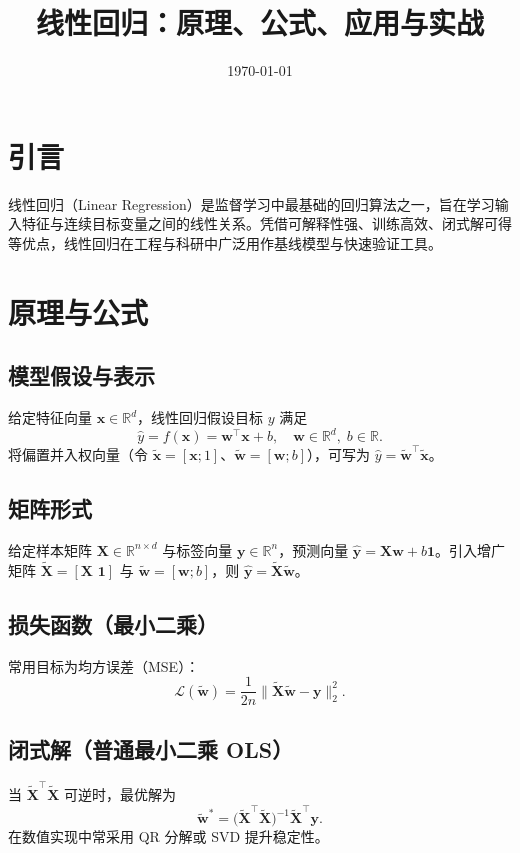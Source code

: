 \documentclass[UTF8,zihao=-4]{ctexart}
\title{线性回归：原理、公式、应用与实战}
\author{}
\date{\today}
\begin{document}
\maketitle

\section{引言}
线性回归（Linear Regression）是监督学习中最基础的回归算法之一，旨在学习输入特征与连续目标变量之间的线性关系。凭借可解释性强、训练高效、闭式解可得等优点，线性回归在工程与科研中广泛用作基线模型与快速验证工具。

\section{原理与公式}
\subsection{模型假设与表示}
给定特征向量 \(\mathbf{x} \in \mathbb{R}^d\)，线性回归假设目标 \(y\) 满足
\begin{equation}
    \hat{y} = f(\mathbf{x}) = \mathbf{w}^\top \mathbf{x} + b,\quad \mathbf{w} \in \mathbb{R}^d,\; b \in \mathbb{R}.
\end{equation}
将偏置并入权向量（令 \(\tilde{\mathbf{x}}=[\mathbf{x};1]\)、\(\tilde{\mathbf{w}}=[\mathbf{w};b]\)），可写为 \(\hat{y}=\tilde{\mathbf{w}}^\top \tilde{\mathbf{x}}\)。

\subsection{矩阵形式}
给定样本矩阵 \(\mathbf{X}\in\mathbb{R}^{n\times d}\) 与标签向量 \(\mathbf{y}\in\mathbb{R}^{n}\)，预测向量 \(\hat{\mathbf{y}}=\mathbf{X}\mathbf{w}+b\mathbf{1}\)。引入增广矩阵 \(\tilde{\mathbf{X}}=[\mathbf{X}\,\,\mathbf{1}]\) 与 \(\tilde{\mathbf{w}}=[\mathbf{w};b]\)，则 \(\hat{\mathbf{y}}=\tilde{\mathbf{X}}\tilde{\mathbf{w}}\)。

\subsection{损失函数（最小二乘）}
常用目标为均方误差（MSE）：
\begin{equation}
    \mathcal{L}(\tilde{\mathbf{w}}) = \frac{1}{2n} \lVert \tilde{\mathbf{X}}\tilde{\mathbf{w}} - \mathbf{y} \rVert_2^2.
\end{equation}

\subsection{闭式解（普通最小二乘 OLS）}
当 \(\tilde{\mathbf{X}}^\top\tilde{\mathbf{X}}\) 可逆时，最优解为
\begin{equation}
    \tilde{\mathbf{w}}^* = \big(\tilde{\mathbf{X}}^\top\tilde{\mathbf{X}}\big)^{-1}\tilde{\mathbf{X}}^\top\mathbf{y}.
\end{equation}
在数值实现中常采用 QR 分解或 SVD 提升稳定性。
\end{document}
